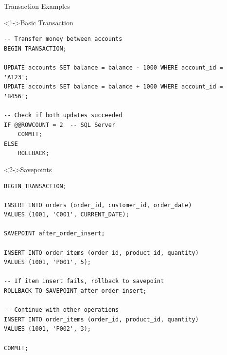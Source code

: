 \documentclass[aspectratio=169,11pt]{beamer}
\begin{document}
\begin{frame}[fragile]{Transaction Examples}
\begin{exampleblock}<1->{Basic Transaction}
\begin{lstlisting}
-- Transfer money between accounts
BEGIN TRANSACTION;

UPDATE accounts SET balance = balance - 1000 WHERE account_id = 'A123';
UPDATE accounts SET balance = balance + 1000 WHERE account_id = 'B456';

-- Check if both updates succeeded
IF @@ROWCOUNT = 2  -- SQL Server
    COMMIT;
ELSE
    ROLLBACK;
\end{lstlisting}
\end{exampleblock}

\pause
\begin{exampleblock}<2->{Savepoints}
\begin{lstlisting}
BEGIN TRANSACTION;

INSERT INTO orders (order_id, customer_id, order_date)
VALUES (1001, 'C001', CURRENT_DATE);

SAVEPOINT after_order_insert;

INSERT INTO order_items (order_id, product_id, quantity)
VALUES (1001, 'P001', 5);

-- If item insert fails, rollback to savepoint
ROLLBACK TO SAVEPOINT after_order_insert;

-- Continue with other operations
INSERT INTO order_items (order_id, product_id, quantity)
VALUES (1001, 'P002', 3);

COMMIT;
\end{lstlisting}
\end{exampleblock}
\end{frame}
\end{document}
